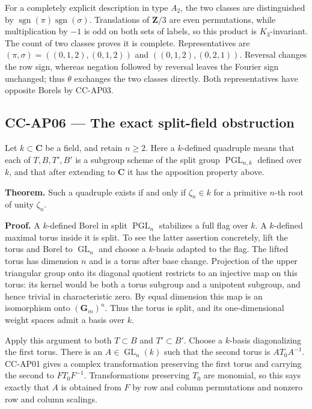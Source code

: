 For a completely explicit description in type \(A_2\), the two classes
are distinguished by
\(\operatorname{sgn}(\pi)\operatorname{sgn}(\sigma)\). Translations of
\(\mathbf Z/3\) are even permutations, while multiplication by \(-1\) is
odd on both sets of labels, so this product is \(K_3\)-invariant. The
count of two classes proves it is complete. Representatives are
\((\pi,\sigma)=((0,1,2),(0,1,2))\) and \(((0,1,2),(0,2,1))\). Reversal
changes the row sign, whereas negation followed by reversal leaves the
Fourier sign unchanged; thus \(\theta\) exchanges the two classes
directly. Both representatives have opposite Borels by CC-AP03.

\subsection{CC-AP06 --- The exact split-field
obstruction}\label{cc-ap06-the-exact-split-field-obstruction}

Let \(k\subset\mathbf C\) be a field, and retain \(n\geq2\). Here a
\(k\)-defined quadruple means that each of \(T,B,T',B'\) is a subgroup
scheme of the split group \(\operatorname{PGL}_{n,k}\) defined over
\(k\), and that after extending to \(\mathbf C\) it has the apposition
property above.

\textbf{Theorem.} Such a quadruple exists if and only if
\(\zeta_n\in k\) for a primitive \(n\)-th root of unity \(\zeta_n\).

\textbf{Proof.} A \(k\)-defined Borel in split \(\operatorname{PGL}_n\)
stabilizes a full flag over \(k\). A \(k\)-defined maximal torus inside
it is split. To see the latter assertion concretely, lift the torus and
Borel to \(\operatorname{GL}_n\) and choose a \(k\)-basis adapted to the
flag. The lifted torus has dimension \(n\) and is a torus after base
change. Projection of the upper triangular group onto its diagonal
quotient restricts to an injective map on this torus: its kernel would
be both a torus subgroup and a unipotent subgroup, and hence trivial in
characteristic zero. By equal dimension this map is an isomorphism onto
\((\mathbf G_m)^n\). Thus the torus is split, and its one-dimensional
weight spaces admit a basis over \(k\).

Apply this argument to both \(T\subset B\) and \(T'\subset B'\). Choose
a \(k\)-basis diagonalizing the first torus. There is an
\(A\in\operatorname{GL}_n(k)\) such that the second torus is
\(AT_0A^{-1}\). CC-AP01 gives a complex transformation preserving the
first torus and carrying the second to \(FT_0F^{-1}\). Transformations
preserving \(T_0\) are monomial, so this says exactly that \(A\) is
obtained from \(F\) by row and column permutations and nonzero row and
column scalings.

